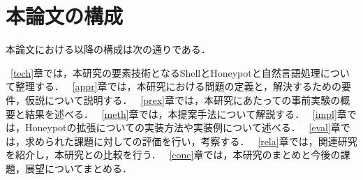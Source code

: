 \section{本論文の構成}
\label{intr:kosei}
本論文における以降の構成は次の通りである．

~\ref{tech}章では，本研究の要素技術となるShellとHoneypotと自然言語処理について整理する．
~\ref{appr}章では，本研究における問題の定義と，解決するための要件，仮説について説明する．
~\ref{prex}章では，本研究にあたっての事前実験の概要と結果を述べる．
~\ref{meth}章では，本提案手法について解説する．
~\ref{impl}章では，Honeypotの拡張についての実装方法や実装例について述べる．
~\ref{eval}章では，求められた課題に対しての評価を行い，考察する．
~\ref{rela}章では，関連研究を紹介し，本研究との比較を行う．
~\ref{conc}章では，本研究のまとめと今後の課題，展望についてまとめる．



